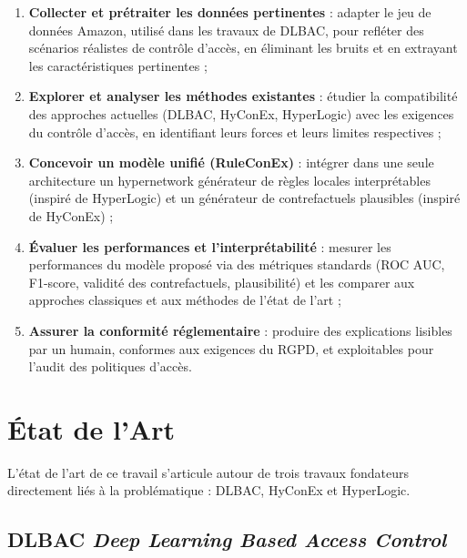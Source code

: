 \documentclass[12pt,a4paper]{article}
\begin{document}
\begin{enumerate}
  \item \textbf{Collecter et pr\'etraiter les donn\'ees pertinentes} : adapter le jeu de donn\'ees Amazon, utilis\'e dans les travaux de DLBAC, pour refl\'eter des sc\'enarios r\'ealistes de contr\^ole d'acc\`es, en \'eliminant les bruits et en extrayant les caract\'eristiques pertinentes ;

  \item \textbf{Explorer et analyser les m\'ethodes existantes} : \'etudier la compatibilit\'e des approches actuelles (DLBAC, HyConEx, HyperLogic) avec les exigences du contr\^ole d'acc\`es, en identifiant leurs forces et leurs limites respectives ;

  \item \textbf{Concevoir un mod\`ele unifi\'e (RuleConEx)} : int\'egrer dans une seule architecture un hypernetwork g\'en\'erateur de r\`egles locales interpr\'etables (inspir\'e de HyperLogic) et un g\'en\'erateur de contrefactuels plausibles (inspir\'e de HyConEx) ;

  \item \textbf{\'Evaluer les performances et l'interpr\'etabilit\'e} : mesurer les performances du mod\`ele propos\'e via des m\'etriques standards (ROC AUC, F1-score, validit\'e des contrefactuels, plausibilit\'e) et les comparer aux approches classiques et aux m\'ethodes de l'\'etat de l'art ;

  \item \textbf{Assurer la conformit\'e r\'eglementaire} : produire des explications lisibles par un humain, conformes aux exigences du RGPD, et exploitables pour l'audit des politiques d'acc\`es.
\end{enumerate}


\section{\'Etat de l'Art}
\label{sec:etat-art}

L'\'etat de l'art de ce travail s'articule autour de trois travaux fondateurs directement li\'es \`a la probl\'ematique : DLBAC, HyConEx et HyperLogic.

\subsection{DLBAC \textit{Deep Learning Based Access Control}}
\end{document}
